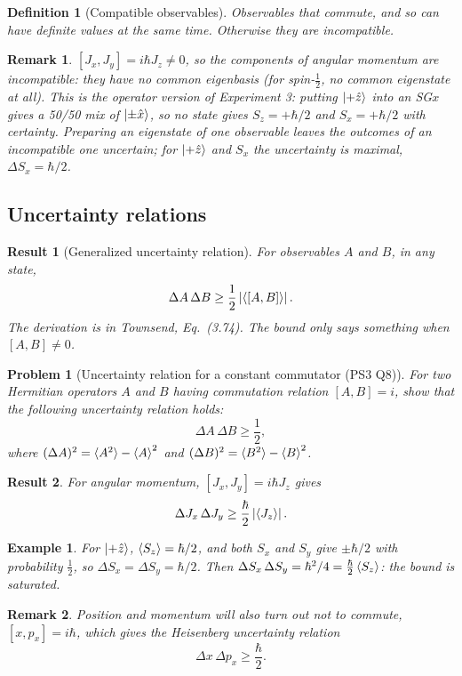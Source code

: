 \documentclass{article}
\newtheorem{definition}{Definition}
\newtheorem{problem}{Problem}
\newtheorem*{example}{Example}
\newtheorem{remark}{Remark}
\newtheorem{result}{Result}
\begin{document}
\begin{definition}[Compatible observables]
    Observables that commute, and so can have definite values at the same time. Otherwise they are incompatible.
\end{definition}
\begin{remark}
    $[J_x,J_y] = i\hbar J_z \neq 0$, so the components of angular momentum are incompatible: they have no common eigenbasis (for spin-$\tfrac12$, no common eigenstate at all). This is the operator version of Experiment 3: putting $\ket{+\hat{z}}$ into an SG$x$ gives a 50/50 mix of $\ket{\pm\hat{x}}$, so no state gives $S_z = +\hbar/2$ and $S_x = +\hbar/2$ with certainty. Preparing an eigenstate of one observable leaves the outcomes of an incompatible one uncertain; for $\ket{+\hat{z}}$ and $S_x$ the uncertainty is maximal, $\Delta S_x = \hbar/2$.
\end{remark}

\subsection{Uncertainty relations}
\begin{result}[Generalized uncertainty relation]
    For observables $A$ and $B$, in any state,
    \begin{equation}
        \Delta A\,\Delta B \geq \frac{1}{2}\left|\braket{[A,B]}\right|.
    \end{equation}
    The derivation is in Townsend, Eq.~(3.74). The bound only says something when $[A,B] \neq 0$.
\end{result}
\begin{problem}[Uncertainty relation for a constant commutator (PS3 Q8)]
    For two Hermitian operators $A$ and $B$ having commutation relation $[A,B] = i$, show that the following uncertainty relation holds:
    \[\Delta A\,\Delta B \geq \frac{1}{2},\]
    where $(\Delta A)^2 = \braket{A^2} - \braket{A}^2$ and $(\Delta B)^2 = \braket{B^2} - \braket{B}^2$.
\end{problem}
\begin{result}
    For angular momentum, $[J_x,J_y] = i\hbar J_z$ gives
    \begin{equation}
        \Delta J_x\,\Delta J_y \geq \frac{\hbar}{2}\left|\braket{J_z}\right|.
    \end{equation}
\end{result}
\begin{example}
    For $\ket{+\hat{z}}$, $\braket{S_z} = \hbar/2$, and both $S_x$ and $S_y$ give $\pm\hbar/2$ with probability $\tfrac12$, so $\Delta S_x = \Delta S_y = \hbar/2$. Then $\Delta S_x\,\Delta S_y = \hbar^2/4 = \frac{\hbar}{2}\braket{S_z}$: the bound is saturated.
\end{example}
\begin{remark}
    Position and momentum will also turn out not to commute, $[x,p_x] = i\hbar$, which gives the Heisenberg uncertainty relation
    \begin{equation}
        \Delta x\,\Delta p_x \geq \frac{\hbar}{2}.
    \end{equation}
\end{remark}
\end{document}
